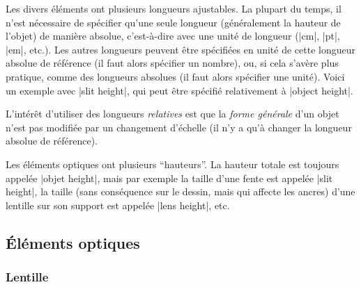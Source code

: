 \documentclass[a4paper]{ltxdoc}
\begin{document}
Les divers éléments ont plusieurs longueurs ajustables. La plupart du temps, il n'est nécessaire de spécifier qu'une seule longueur (généralement la hauteur de l'objet) de manière absolue, c'est-à-dire avec une unité de longueur (|cm|, |pt|, |em|, etc.). Les autres longueurs peuvent être spécifiées en unité de cette longueur absolue de référence (il faut alors spécifier un nombre), ou, si cela s'avère plus pratique, comme des longueurs absolues (il faut alors spécifier une unité). Voici un exemple avec |slit height|, qui peut être spécifié relativement à |object height|.

\begin{codeexample}[width=6cm]
\end{codeexample}

L'intérêt d'utiliser des longueurs \emph{relatives} est que la \emph{forme générale} d'un objet n'est pas modifiée par un changement d'échelle (il n'y a qu'à changer la longueur absolue de référence).

Les éléments optiques ont plusieurs \enquote{hauteurs}. La hauteur totale est toujours appelée |objet height|, mais par exemple la taille d'une fente est appelée |slit height|, la taille (sans conséquence sur le dessin, mais qui affecte les ancres) d'une lentille sur son support est appelée |lens height|, etc.



\subsection{Éléments optiques}

\subsubsection{Lentille}
\end{document}
